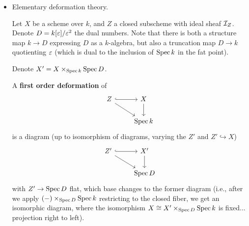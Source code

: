\documentclass[12pt]{article}
\begin{document}
\begin{itemize}
\begin{proof}
        To get the open cover, first note that for each orbit $G\cdot x$, we can find an affine open containing it---this is where the quasiprojective hypothesis comes into play (in particular this could be false for just a proper variety). Specifically, $X$ is locally closed in some projective space, and because $G\cdot x$ is finite, we can choose a hypersurface dodging it. Then, the complement is affine {\color{red} I believe this for an projective variety... maybe slightly suspicious for a quasiprojective one...}. This is then an open that works.

        Now that we can contain any orbit in an affine, this gives us an affine open cover $U_i$, but it still need not be $G$-invariant. Replace the $U_i$ with
        \[W_i = \bigcap_{g\in G} g\cdot U_i,\]
        which is still affine (because $X$ is separated, since it is a variety). Now, these $W_i$ are $G$-invariant by construction, and we glue together the affine GIT quotients $W_i/G$.
    \end{proof}

    \begin{prop}
        Let $X$ be a connected variety over $k$. Then $X^{[n]}$ is connected for all $n\geq 0$.
    \end{prop}

    \begin{proof}
        {\color{blue} TODO!!!}
    \end{proof}


    \item {\color{blue} Elementary deformation theory.}

    Let $X$ be a scheme over $k$, and $Z$ a closed subscheme with ideal sheaf $\mathcal{I}_Z$. Denote $D=k[\varepsilon]/\varepsilon^2$ the dual numbers. Note that there is both a structure map $k\to D$ expressing $D$ as a $k$-algebra, but also a truncation map $D\to k$ quotienting $\varepsilon$ (which is dual to the inclusion of $\operatorname{Spec} k$ in the fat point).

    Denote $X' = X\times_{\operatorname{Spec} k} \operatorname{Spec} D$.

    \begin{defn}
        A \textbf{first order deformation} of
        \[\begin{tikzcd}
            Z \rar[hook] \ar[rd] & X\dar\\
            & \Spec k
        \end{tikzcd}\]
        is a diagram (up to isomorphism of diagrams, varying the $Z'$ and $Z'\hookrightarrow X$)
        \[\begin{tikzcd}
            Z' \rar[hook] \ar[rd] & X' \dar\\
            & \Spec D
        \end{tikzcd}\]
        with $Z'\to \operatorname{Spec} D$ flat, which base changes to the former diagram (i.e., after we apply $(-) \times_{\operatorname{Spec} D} \operatorname{Spec} k$ restricting to the closed fiber, we get an isomorphic diagram, where the isomorphism $X \cong X' \times_{\operatorname{Spec} D} \operatorname{Spec} k$ is fixed... projection right to left).
    \end{defn}


\end{itemize}
\end{document}
